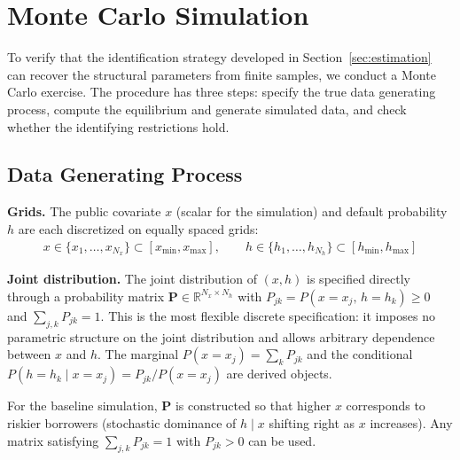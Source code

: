 \documentclass[12pt]{article}
\theoremstyle{plain}
\theoremstyle{plain}
\theoremstyle{definition}  %
\theoremstyle{remark}  %
\begin{document}
\newpage
\section{Monte Carlo Simulation}\label{sec:simulation}

To verify that the identification strategy developed in Section~\ref{sec:estimation} can recover the structural parameters from finite samples, we conduct a Monte Carlo exercise. The procedure has three steps: specify the true data generating process, compute the equilibrium and generate simulated data, and check whether the identifying restrictions hold.

\subsection{Data Generating Process}\label{sec:dgp}

\textbf{Grids.} The public covariate $x$ (scalar for the simulation) and default probability $h$ are each discretized on equally spaced grids:
\begin{align*}
    x \in \{x_1, \ldots, x_{N_x}\} \subset [x_{\min}, x_{\max}], \qquad
    h \in \{h_1, \ldots, h_{N_h}\} \subset [h_{\min}, h_{\max}]
\end{align*}

\textbf{Joint distribution.} The joint distribution of $(x, h)$ is specified directly through a probability matrix $\mathbf{P} \in \mathbb{R}^{N_x \times N_h}$ with $P_{jk} = P(x = x_j,\, h = h_k) \geq 0$ and $\sum_{j,k} P_{jk} = 1$. This is the most flexible discrete specification: it imposes no parametric structure on the joint distribution and allows arbitrary dependence between $x$ and $h$. The marginal $P(x = x_j) = \sum_k P_{jk}$ and the conditional $P(h = h_k \mid x = x_j) = P_{jk} / P(x = x_j)$ are derived objects.

For the baseline simulation, $\mathbf{P}$ is constructed so that higher $x$ corresponds to riskier borrowers (stochastic dominance of $h \mid x$ shifting right as $x$ increases). Any matrix satisfying $\sum_{j,k} P_{jk} = 1$ with $P_{jk} > 0$ can be used.
\end{document}
